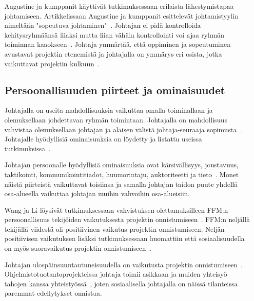 \documentclass[finnish]{tktltiki2}
\theoremstyle{definition}
\theoremstyle{remark}
\begin{document}
Augustine ja kumppanit käyttivät tutkimuksessaan erilaista lähestymistapaa johtamiseen. Artikkelissaan Augustine ja kumppanit esittelevät johtamistyylin nimeltään "sopeutuva johtaminen"~\cite{Augustine:2005:APM:1101779.1101781}. Johtajan ei pidä kontrolloida kehitysryhmäänsä liiaksi mutta liian vähäin kontrollointi voi ajaa ryhmän toiminnan kaaokseen~\cite{Augustine:2005:APM:1101779.1101781}. Johtaja ymmärtää, että oppiminen ja sopeutuminen avustavat projektin etenemistä ja johtajalla on ymmärys eri osista, jotka vaikuttavat projektin kulkuun~\cite{Augustine:2005:APM:1101779.1101781}. 





\subsection{Persoonallisuuden piirteet ja ominaisuudet}

Johtajalla on useita mahdollisuuksia vaikuttaa omalla toiminallaan ja olemuksellaan johdettavan ryhmän toimintaan. Johtajalla on mahdollisuus vahvistaa olemuksellaan johtajan ja alaisen välistä johtaja-seuraaja sopimusta~\cite{raccoon2006leadership}. Johtajalle hyödyllisiä ominaisuuksia on löydetty ja listattu useissa tutkimuksissa~\cite{raccoon2006leadership, Wang:2009:PMP:1639950.1640049, bradley1997effect, 4017705}. 

Johtajan persoonalle hyödyllisiä ominaisuuksia ovat kärsivällisyys, joustavuus, taktikointi, kommunikointitiadot, huumorintaju, auktoriteetti ja tieto~\cite{4017705}. Monet näistä piirteistä vaikuttavat toisiinsa ja samalla johtajan taidon puute yhdellä osa-alueella vaikuttaa johtajan muihin vahvoihin osa-alueisiin. 

Wang ja Li löysivät tutkimuksessaan vahvistuksen olettamuksilleen FFM:n persoonallisuus tekijöiden vaikutuksesta projektin onnistumiseen~\cite{Wang:2009:PMP:1639950.1640049}. FFM:n neljällä tekijällä viidestä oli positiivinen vaikutus projektin onnistumiseen. Neljän positiivisen vaikutuksen lisäksi tutkimuksessaan huomattiin että sosiaalisuudella on myös suoravaikutus projektin onnistumiseen~\cite{Wang:2009:PMP:1639950.1640049}. 

Johtajan ulospäinsuuntautuneisuudella on vaikutusta projektin onnistumiseen~\cite{Wang:2009:PMP:1639950.1640049}. Ohjelmistotuotantoprojekteissa johtaja toimii asikkaan ja muiden yhteisyö tahojen kanssa yhteistyössä~\cite{McLeod:2011:FAS:1978802.1978803}, joten sosiaalisella johtajalla on näissä tilanteissa paremmat edellytykset onnistua.  
\end{document}
